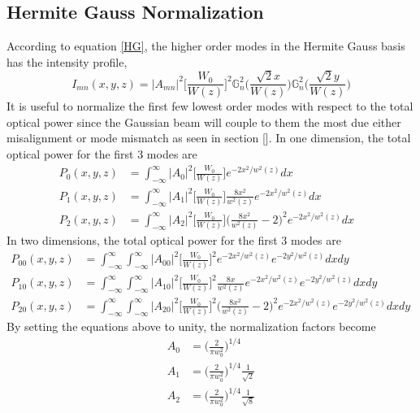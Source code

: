 \begin{appendices}
	\chapter{Hermite Gauss Normalization}
	According to equation \ref{HG}, the higher order modes in the Hermite Gauss basis has the intensity profile,
	\begin{equation}
		I_{mn} (x,y,z) = \vert A_{mn} \vert^2 \bigg[ \frac{W_0}{W(z)} \bigg]^2  \mathbb{G}^2_n\Bigg( \frac{\sqrt{2}x}{W(z)} \Bigg) \mathbb{G}^2_n\Bigg( \frac{\sqrt{2}y}{W(z)} \Bigg)
	\end{equation}
	It is useful to normalize the first few lowest order modes with respect to the total optical power since the Gaussian beam will couple to them the most due either misalignment or mode mismatch as seen in section []. In one dimension, the total optical power for the first 3 modes are
	\begin{equation}
	\label{HGNormalInt1D}
	\begin{aligned}
		P_{0}(x,y,z) 	& 	=	\int_{-\infty}^{\infty}  \vert A_{0} \vert^2   \bigg[ \frac{W_0}{W(z)} \bigg] e^{-2x^2/w^2(z)} dx	&
	\\	P_{1}(x,y,z)	&	=	\int_{-\infty}^{\infty}  \vert A_{1} \vert^2  \bigg[ \frac{W_0}{W(z)} \bigg] \frac{8x^2}{w^2(z)} 	
								e^{-2x^2/w^2(z)}dx &
	\\	P_{2}(x,y,z)	&	= 	\int_{-\infty}^{\infty}  \vert A_{2} \vert^2   \bigg[ \frac{W_0}{W(z)} \bigg] \bigg(\frac{8x^2}{w^2(z)}	-2\bigg)^2e^{-2x^2/w^2(z)}dx
	\end{aligned}
	\end{equation}
	In two dimensions, the total optical power for the first 3 modes are
	\begin{equation}
	\label{HGNormalInt2D}
	\begin{aligned}
		P_{00}(x,y,z) 	& 	=	 \int_{-\infty}^{\infty} \int_{-\infty}^{\infty}  \vert A_{00} \vert^2   \bigg[ \frac{W_0}{W(z)} \bigg]^2 e^{-2x^2/w^2(z)}e^{-2y^2/w^2(z)} dx dy&
	\\	P_{10}(x,y,z)	&	=	\int_{-\infty}^{\infty} \int_{-\infty}^{\infty}  \vert A_{10} \vert^2  \bigg[ \frac{W_0}{W(z)} \bigg]^2 \frac{8x}{w^2(z)} e^{-2x^2/w^2(z)}e^{-2y^2/w^2(z)} dx dy&
	\\	P_{20}(x,y,z)	&	= 	\int_{-\infty}^{\infty} \int_{-\infty}^{\infty}  \vert A_{20} \vert^2   \bigg[ \frac{W_0}{W(z)} \bigg]^2 \bigg(\frac{8x^2}{w^2(z)} - 2\bigg)^2 e^{-2x^2/w^2(z)}e^{-2y^2/w^2(z)} dx dy
	\end{aligned}
	\end{equation}
	By setting the equations above to unity, the normalization factors become
	\begin{equation}
	\begin{aligned}
		A_{0} &	= \bigg( \frac{2}{\pi w_0^2} \bigg)^{1/4} 
	\\	A_{1} &	= \bigg( \frac{2}{\pi w_0^2} \bigg)^{1/4} \frac{1}{\sqrt{2}}
	\\	A_{2} &	= \bigg( \frac{2}{\pi w_0^2} \bigg)^{1/4} \frac{1}{\sqrt{8}}
	\end{aligned}
	\end{equation}
	

\end{appendices}

